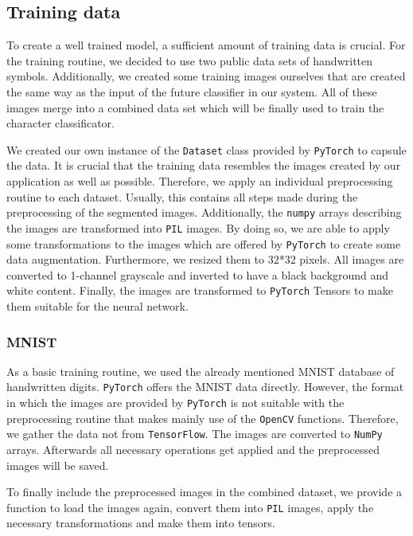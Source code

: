 \documentclass[12pt]{article}
\begin{document}
\begin{itemize}
\begin{itemize}
\begin{itemize}
\begin{itemize}
\begin{itemize}
\begin{itemize}
\begin{itemize}
\begin{itemize}
\begin{itemize}
\begin{itemize}
	\subsection{Training data}
		To create a well trained model, a sufficient amount of training data is crucial. For the training routine, we decided to use two public data sets of handwritten symbols. Additionally, we created some training images ourselves that are created the same way as the input of the future classifier in our system. All of these images merge into a combined data set which will be finally used to train the character classificator.
		
		We created our own instance of the \texttt{Dataset} class provided by \texttt{PyTorch} to capsule the data. It is crucial that the training data resembles the images created by our application as well as possible. Therefore, we apply an individual preprocessing routine to each dataset. Usually, this contains all steps made during the preprocessing of the segmented images. Additionally, the \texttt{numpy} arrays describing the images are transformed into \texttt{PIL} images. By doing so, we are able to apply some transformations to the images which are offered by \texttt{PyTorch} to create some data augmentation. Furthermore, we resized them to 32*32 pixels. All images are converted to 1-channel grayscale and inverted to have a black background and white content. Finally, the images are transformed to \texttt{PyTorch} Tensors to make them suitable for the neural network. 
		
		\subsubsection{MNIST}
			As a basic training routine, we used the already mentioned MNIST database of handwritten digits. \texttt{PyTorch} offers the MNIST data directly. However, the format in which the images are provided by \texttt{PyTorch} is not suitable with the preprocessing routine that makes mainly use of the \texttt{OpenCV} functions. Therefore, we gather the data not from \texttt{TensorFlow}. The images are converted to \texttt{NumPy} arrays. Afterwards all necessary operations get applied and the preprocessed images will be saved. 
			
			To finally include the preprocessed images in the combined dataset, we provide a function to load the images again, convert them into \texttt{PIL} images, apply the necessary transformations and make them into tensors.
			

\end{itemize}
\end{itemize}
\end{itemize}
\end{itemize}
\end{itemize}
\end{itemize}
\end{itemize}
\end{itemize}
\end{itemize}
\end{itemize}
\end{document}
